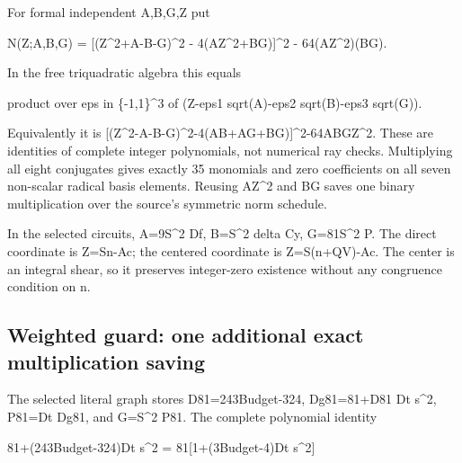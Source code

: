 For formal independent A,B,G,Z put



N(Z;A,B,G) =\allowbreak{} [(Z\textasciicircum{}\allowbreak{}2+\allowbreak{}A-B-G)\textasciicircum{}\allowbreak{}2 - 4(AZ\textasciicircum{}\allowbreak{}2+\allowbreak{}BG)]\textasciicircum{}\allowbreak{}2 - 64(AZ\textasciicircum{}\allowbreak{}2)(BG).



In the free triquadratic algebra this equals



product over eps in \{-1,1\}\textasciicircum{}\allowbreak{}3 of (Z-eps1 sqrt(A)-eps2 sqrt(B)-eps3 sqrt(G)).



Equivalently it is [(Z\textasciicircum{}\allowbreak{}2-A-B-G)\textasciicircum{}\allowbreak{}2-4(AB+\allowbreak{}AG+\allowbreak{}BG)]\textasciicircum{}\allowbreak{}2-64ABGZ\textasciicircum{}\allowbreak{}2. These are identities of complete integer polynomials, not numerical ray checks. Multiplying all eight conjugates gives exactly 35 monomials and zero coefficients on all seven non-scalar radical basis elements. Reusing AZ\textasciicircum{}\allowbreak{}2 and BG saves one binary multiplication over the source's symmetric norm schedule.



In the selected circuits, A=\allowbreak{}9S\textasciicircum{}\allowbreak{}2 Df, B=\allowbreak{}S\textasciicircum{}\allowbreak{}2 delta Cy, G=\allowbreak{}81S\textasciicircum{}\allowbreak{}2 P. The direct coordinate is Z=\allowbreak{}Sn-Ac; the centered coordinate is Z=\allowbreak{}S(n+\allowbreak{}QV)-Ac. The center is an integral shear, so it preserves integer-zero existence without any congruence condition on n.



\subsection*{Weighted guard: one additional exact multiplication saving}



The selected literal graph stores D81=\allowbreak{}243Budget-324, Dg81=\allowbreak{}81+\allowbreak{}D81 Dt s\textasciicircum{}\allowbreak{}2, P81=\allowbreak{}Dt Dg81, and G=\allowbreak{}S\textasciicircum{}\allowbreak{}2 P81. The complete polynomial identity



81+\allowbreak{}(243Budget-324)Dt s\textasciicircum{}\allowbreak{}2 =\allowbreak{} 81[1+\allowbreak{}(3Budget-4)Dt s\textasciicircum{}\allowbreak{}2]



